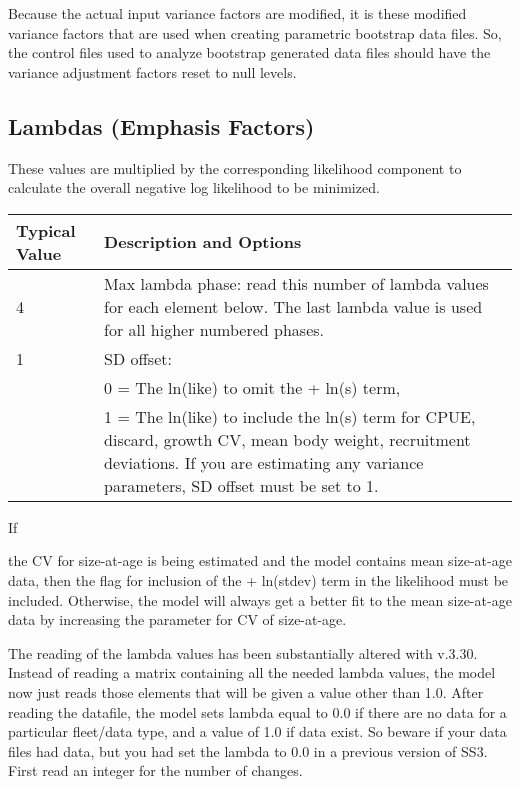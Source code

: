 Because the actual input variance factors are modified, it is these modified variance factors that are used when creating parametric bootstrap data files. So, the control files used to analyze bootstrap generated data files should have the variance adjustment factors reset to null levels.


\hypertarget{Lambdas}{}
\subsection{Lambdas (Emphasis Factors)}
These values are multiplied by the corresponding likelihood component to calculate the overall negative log likelihood to be minimized.


\begin{tabular}{p{3cm} p{13cm}}
	\hline
	Typical Value & Description and Options \Tstrut\Bstrut\\
	\hline
	4 \Tstrut & Max lambda phase: read this number of lambda values for each element below. The last lambda value is used for all higher numbered phases. \Bstrut\\
	1 & SD offset: \\
	  & 0 = The ln(like) to omit the + ln(s) term, \\
	  & 1 = The ln(like) to include the ln(s) term for CPUE, discard, growth CV, mean body weight, recruitment deviations. If you are estimating any variance parameters, SD offset must be set to 1. \Bstrut\\
	\hline
\end{tabular}

\pagebreak

\hypertarget{SaAlambda}{If} the CV for size-at-age is being estimated and the model contains mean size-at-age data, then the flag for inclusion of the + ln(stdev) term in the likelihood must be included. Otherwise, the model will always get a better fit to the mean size-at-age data by increasing the parameter for CV of size-at-age.

The reading of the lambda values has been substantially altered with v.3.30. Instead of reading a matrix containing all the needed lambda values, the model now just reads those elements that will be given a value other than 1.0. After reading the datafile, the model sets lambda equal to 0.0 if there are no data for a particular fleet/data type, and a value of 1.0 if data exist. So beware if your data files had data, but you had set the lambda to 0.0 in a previous version of SS3. First read an integer for the number of changes.

